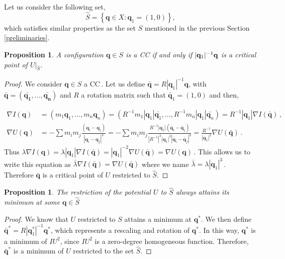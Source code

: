 \documentclass[final,11pt]{article}
\numberwithin{equation}{section}
\newtheorem{proposition}[theorem]{Proposition}
\theoremstyle{definition}
\begin{document}
Let us consider the following set,
\begin{equation*}
\hat{S}=\left\{\mathbf{q}\in X\colon \mathbf{q}_1=(1,0)\right\},
\end{equation*}
which satisfies similar properties as the set $S$ mentioned in the previous Section \ref{preliminaries}.

\begin{proposition}
A configuration $\mathbf{q}\in S$ is a CC if and only if $|\mathbf{q}_1|^{-1} \bf{q}$ is a critical point of $U|_{\hat{S}}$.
\end{proposition}
\begin{proof}
We consider $\mathbf{q}\in S$ a CC\,. Let us define $\bar{\mathbf{q}}=R|\mathbf{q}_1|^{-1}\mathbf{q}$, with $\bar{\mathbf{q}}=(\bar{\mathbf{q_{1}}},...,\bar{\mathbf{q_{n}}})$ and $R$ a rotation matrix such that $\bar{\mathbf{q}}_1=(1,0)$ and then,

\begin{align*}
\nabla I(\mathbf{q})&=(m_1\mathbf{q}_1,...,m_n\mathbf{q}_n)=
\left(R^{-1}m_1|\mathbf{q}_1|\bar{\mathbf{q}_1},...,R^{-1}m_n|\mathbf{q}_1|\bar{\mathbf{q}_n}\right)
=R^{-1}|\mathbf{q}_1|\nabla I(\bar{\mathbf{q}})\,,\\
\nabla U(\mathbf{q})&=-\sum{m_im_j} \frac{(\mathbf{q}_i-\mathbf{q}_j)}{|\mathbf{q}_i-\mathbf{q}_j|^3}=-\sum{m_im_j} \frac{R^{-1}|{\mathbf{q}}_1|(\bar{\mathbf{q}}_i-\bar{\mathbf{q}}_j)}{|R^{-1}|^{3}|\mathbf{q}_1|^3|\bar{\mathbf{q}}_i-\bar{\mathbf{q}}_j|^3}=\frac{R^{-1}}{|\mathbf{q}_1|^2}\nabla U(\bar{\mathbf{q}})\,.
\end{align*}
Thus $\lambda \nabla I(\mathbf{q})=\lambda |\mathbf{q}_1|\nabla I(\bar{\mathbf{q}})=|\mathbf{q}_1|^{-2}\nabla U(\bar{\mathbf{q}})=\nabla U(\mathbf{q})$\,. 
This allows us to write this equation as $\bar{\lambda}\nabla I(\bar{\mathbf{q}})=\nabla U(\bar{\mathbf{q}})$ where we name $\bar{\lambda}=\lambda|\mathbf{q}_1|^3$\,. Therefore  $\bar{\mathbf{q}}$ is a critical point of $U$ restricted to $\hat{S}$.
\end{proof}

\begin{proposition}
The restriction of the potential $U$ to $\hat{S}$ always attains its minimum at some $\mathbf{q}\in \hat{S}$
\end{proposition}
\begin{proof}

We know that $ U $ restricted to $ S $ attains a minimum at $ \mathbf{q}^* $. We then define $ \bar{\mathbf{q}}^* = R | \mathbf{q}_1^* |^{-1} \mathbf{q}^* $, which represents a rescaling and rotation of $ \mathbf{q}^* $. In this way, $ \mathbf{q}^* $ is a minimum of $ I U^2 $, since $ I U^2 $ is a zero-degree homogeneous function. Therefore, $ \bar{\mathbf{q}}^* $ is a minimum of $ U $ restricted to the set $ \hat{S} $.
\end{proof}		
\end{document}
